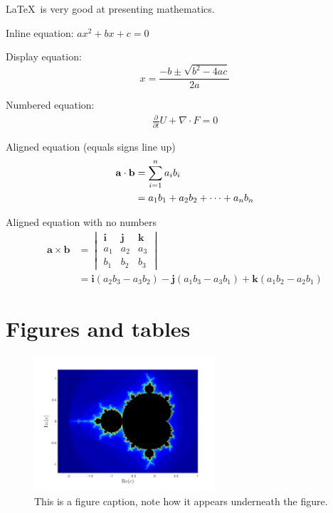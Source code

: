 \documentclass[11pt, a4paper]{report}
\begin{document}
\LaTeX\ is very good at presenting mathematics.

Inline equation: $ax^2 + bx + c = 0$

Display equation:
$$x = \frac{-b \pm \sqrt{b^2 - 4ac}}{2a}$$

Numbered equation:
\begin{align}
  \label{eq:equation label} %
  \frac{\partial}{\partial t} U + \nabla \cdot F = 0
\end{align}

Aligned equation (equals signs line up)
\begin{align}
  \notag %
  \label{eq:dot product}
  \mathbf{a} \cdot \mathbf{b} &= \sum_{i=1}^n a_ib_i \\
  &= a_1b_1 + a_2b_2 + \cdots + a_nb_n
\end{align}

Aligned equation with no numbers
\begin{align*}
  \mathbf{a} \times \mathbf{b} &= \begin{vmatrix} 
  \mathbf{i} & \mathbf{j} & \mathbf{k} \\ a_1 & a_2 & a_3 \\ b_1 & b_2 & b_3 \end{vmatrix} \\
  &= \mathbf{i}(a_2b_3 - a_3b_2) - \mathbf{j}(a_1b_3 - a_3b_1) + \mathbf{k}(a_1b_2 - a_2b_1)  
\end{align*}

\section{Figures and tables}

\begin{figure}[H]
  \begin{center}
    \includegraphics[width = 0.6\textwidth]{Images/mandelbrot} %
    \caption{This is a figure caption, note how it appears underneath the figure.} %
    \label{fig:figure label} %
  \end{center}
\end{figure}
\end{document}
